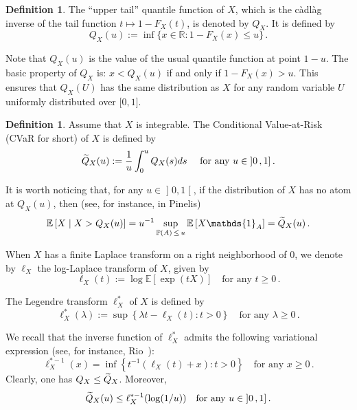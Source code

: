 \documentclass[10pt]{amsart}
\theoremstyle{definition}\newtheorem{defi}[theo]{Definition}\newtheorem{rema}[theo]{Remark}\newtheorem{exam}[theo]{Example}\newtheorem{exem}[theo]{Example}\newtheorem{nota}[theo]{Notation}
\newcommand{\bE}{\mathbb{E}}
\newcommand{\bP}{\mathbb{P}}
\newcommand{\bR}{\mathbb{R}}
\newcommand{\intervalleoo}[2]{\mathopen{]} #1\mathclose{}\mathpunct{},#2\mathclose{[}}
\newcommand{\intervalleff}[2]{\mathopen{[} #1\mathclose{}\mathpunct{},#2\mathclose{]}}
\newcommand{\intervalleof}[2]{\mathopen{]} #1\mathclose{}\mathpunct{},#2\mathclose{]}}
\newcommand{\ind}{\mathds{1}}
\let\oldtilde\tilde
\renewcommand*{\tilde}[1]{\mathchoice{\widetilde{#1}}{\widetilde{#1}}{\oldtilde{#1}}{\oldtilde{#1}}}
\begin{document}
\begin{defi}\label{def:CVaR}
The ``upper tail'' quantile function of $X$, which is the càdlàg inverse of the tail function $t\mapsto 1-F_X(t)$, is denoted by $Q_X$. It is defined by
\[
Q_X(u):=\inf\{x\in\bR:1-F_X(x)\leq u\}\,.
\]
\end{defi}

Note that $Q_X(u)$ is the value of the usual quantile function at point $1-u$. The basic property of $Q_X$ is: $x<Q_X(u)$ if and only if $1-F_X(x)>u$. This ensures that $Q_X(U)$ has the same distribution as $X$ for any random variable $U$ uniformly distributed over $\intervalleff 01$.


\begin{defi}
Assume that $X$ is integrable. The Conditional Value-at-Risk (CVaR for short) of $X$ is defined by
\begin{equation}\label{eqn:def CVaR}
\tilde Q_X(u):=\frac{1}{u}\int_0^u Q_X(s)ds\quad\text{ for any }u\in\intervalleof 01\,.
\end{equation}
\end{defi}

It is worth noticing that, for any $u\in\intervalleoo 01$, if the distribution of $X$ has no atom at $Q_X(u)$, then (see, for instance, \cite[Section~5.9]{Pinelis14b} in Pinelis)
\[
\bE\left[X\mid X>Q_X(u)\right]= u^{-1}\sup_{\bP(A)\,\leq\,u}\bE\left[X\ind_A\right]=\tilde Q_X(u)\,.
\]

When $X$ has a finite Laplace transform on a right neighborhood of $0$, we denote by $\ell_X$ the log-Laplace transform of $X$, given by
\begin{equation}\label{eqn:def logLaplace}
\ell_X(t):=\log\bE\left[\exp(tX)\right]\quad \text{for any }t\geq 0\,.
\end{equation}

The Legendre transform $\ell_X^*$ of $X$ is defined by
\begin{equation}\label{eqn:def Legendre transform}
\ell_X^*(\lambda):=\sup\left\{\lambda t - \ell_X(t) : t>0\right\}\quad\text{for any }\lambda\geq0\,.
\end{equation}

We recall that the inverse function of $\ell_X^*$ admits the following variational expression (see, for instance, Rio~\cite[Lemma~A.2]{Rio17b}):
\begin{equation}\label{eqn:inverse Legendre transform}
\ell_X^{*-1}(x)=\inf\left\{t^{-1}(\ell_X(t)+x) : t>0\right\}\quad\text{for any }x\geq 0\,.
\end{equation}
Clearly, one has $Q_X\leq\tilde Q_X$. Moreover,
\begin{equation}\label{eqn:comparaison CVAR Leg}
\tilde Q_X(u)\leq \ell^{*-1}_X(\log(1/u))\quad\text{for any }u\in\intervalleof 01\,.
\end{equation}
\end{document}
